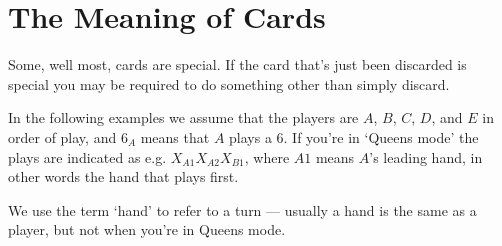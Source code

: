 \documentclass[12pt]{article}
\begin{document}
\section{The Meaning of Cards}
\label{specialCards}

Some, well most, cards are special.  If the card that's just been discarded is special you
may be required to do something other than simply discard.

In the following examples we assume that the players are $A$, $B$, $C$, $D$, and $E$ in order of play,
and $6_A$ means that $A$ plays a 6.  If you're in `Queens mode' the plays are indicated as e.g. $X_{A1} X_{A2} X_{B1}$,
where $A1$ means $A$'s leading hand, in other words the hand that plays first.

We use the term `hand' to refer to a turn --- usually a hand is the same as a player, but not when
you're in Queens mode.
\end{document}
